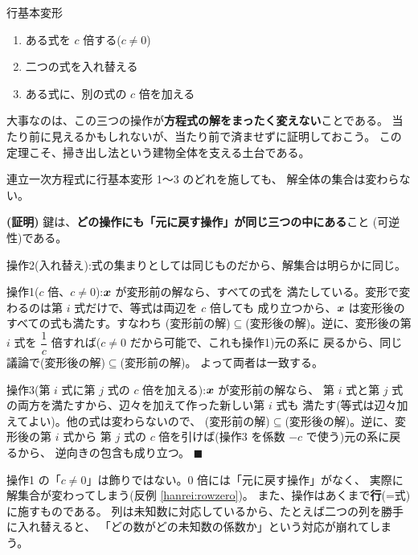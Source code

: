 \begin{itembox}[l]{行基本変形}
\begin{enumerate}
\item ある式を $c$ 倍する($c \neq 0$)
\item 二つの式を入れ替える
\item ある式に、別の式の $c$ 倍を加える
\end{enumerate}
\end{itembox}

大事なのは、この三つの操作が\textbf{方程式の解をまったく変えない}ことである。
当たり前に見えるかもしれないが、当たり前で済ませずに証明しておこう。
この定理こそ、掃き出し法という建物全体を支える土台である。

\begin{teiri}[行基本変形は解集合を変えない]\label{thm:rowop}
連立一次方程式に行基本変形 1〜3 のどれを施しても、
解全体の集合は変わらない。
\end{teiri}

\noindent\textbf{(証明)}\quad
鍵は、\textbf{どの操作にも「元に戻す操作」が同じ三つの中にある}こと
(可逆性)である。

操作2(入れ替え):式の集まりとしては同じものだから、解集合は明らかに同じ。

操作1($c$ 倍、$c \neq 0$):$\bm{x}$ が変形前の解なら、すべての式を
満たしている。変形で変わるのは第 $i$ 式だけで、等式は両辺を $c$ 倍しても
成り立つから、$\bm{x}$ は変形後のすべての式も満たす。すなわち
(変形前の解)$\subseteq$(変形後の解)。逆に、変形後の第 $i$ 式を
$\dfrac{1}{c}$ 倍すれば($c \neq 0$ だから可能で、これも操作1)元の系に
戻るから、同じ議論で(変形後の解)$\subseteq$(変形前の解)。
よって両者は一致する。

操作3(第 $i$ 式に第 $j$ 式の $c$ 倍を加える):$\bm{x}$ が変形前の解なら、
第 $i$ 式と第 $j$ 式の両方を満たすから、辺々を加えて作った新しい第 $i$ 式も
満たす(等式は辺々加えてよい)。他の式は変わらないので、
(変形前の解)$\subseteq$(変形後の解)。逆に、変形後の第 $i$ 式から
第 $j$ 式の $c$ 倍を引けば(操作3 を係数 $-c$ で使う)元の系に戻るから、
逆向きの包含も成り立つ。 $\blacksquare$

\begin{chui}
操作1 の「$c \neq 0$」は飾りではない。$0$ 倍には「元に戻す操作」がなく、
実際に解集合が変わってしまう(反例 \ref{hanrei:rowzero})。
また、操作はあくまで\textbf{行}(=式)に施すものである。
列は未知数に対応しているから、たとえば二つの列を勝手に入れ替えると、
「どの数がどの未知数の係数か」という対応が崩れてしまう。
\end{chui}

